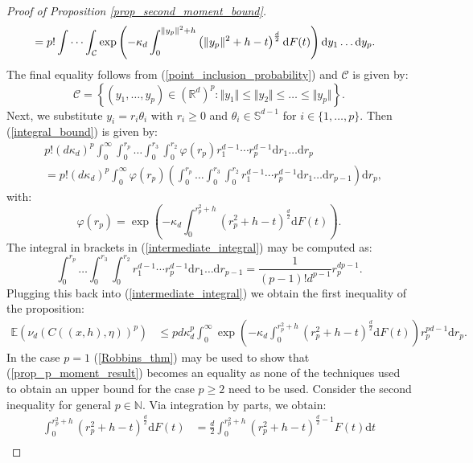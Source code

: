 \documentclass{article}
\newcommand{\NN}{\mathbb{N}}
\newcommand{\RR}{\mathbb{R}}
\newcommand{\EE}{\mathbb{E}}
\newcommand{\Sp}{\mathbb{S}}
\theoremstyle{plain}
\theoremstyle{remark}
\theoremstyle{definition}
\begin{document}
\begin{proof}[Proof of Proposition \ref{prop_second_moment_bound}]
\begin{align}
        &= p!\idotsint_\mathcal{C}\exp\left(-\kappa_d\int_0^{\Vert y_p\Vert^2 + h}\left(\Vert y_p\Vert^2 + h -t \right)^\frac{d}{2}\mathrm{d}F(t)\right)\mathrm{d}y_1 \dots\mathrm{d}y_p. \label{integral_bound}
    \end{align}
    The final equality follows from (\ref{point_inclusion_probability}) and $\mathcal{C}$ is given by:
     \[\mathcal{C} = \left\{(y_1,\dots,y_p) \in (\RR^d)^p: \Vert y_{1} \Vert \leq \Vert y_{2}\Vert \leq \dots \leq \Vert y_{p} \Vert  \right\}.\]
    Next, we substitute $y_i = r_i\theta_i$ with $r_i \geq 0$ and $\theta_i \in \Sp^{d-1}$ for $i \in \{1,\dots,p\}$. Then (\ref{integral_bound}) is given by:
    \begin{align}
         & p!(d\kappa_d)^p \int_0^\infty \int_0^{r_{p}} \dots \int_0^{r_3} \int_0^{r_2} \varphi(r_p)r_1^{d-1}\cdots r_p^{d-1}\mathrm{d}r_1\dots \mathrm{d}r_p \nonumber \\
        &= p!(d\kappa_d)^p \int_0^\infty \varphi(r_p) \left( \int_0^{r_{p}} \dots \int_0^{r_3} \int_0^{r_2}r_1^{d-1}\cdots r_p^{d-1}\mathrm{d}r_1\dots \mathrm{d}r_{p-1}\right)\mathrm{d}r_p, \label{intermediate_integral}
    \end{align}
    with: 
    \[\varphi(r_p) = \exp\left(-\kappa_d\int_0^{r_p^2 + h}\left(r_p^2 + h -t \right)^\frac{d}{2}\mathrm{d}F(t)\right).\]
    The integral in brackets in (\ref{intermediate_integral}) may be computed as:    \[\int_0^{r_{p}} \dots \int_0^{r_3} \int_0^{r_2}r_1^{d-1}\cdots r_p^{d-1}\mathrm{d}r_1\dots \mathrm{d}r_{p-1} = \frac{1}{(p-1)! d^{p-1}}r_p^{dp-1}.\]
    Plugging this back into (\ref{intermediate_integral}) we obtain the first inequality of the proposition:
    \begin{align}
        \EE\left(\nu_d(C((x,h),\eta))^p\right) &\leq pd\kappa_d^p\int_0^\infty \exp\left(-\kappa_d\int_0^{r_p^2 + h}\left(r_p^2 + h -t \right)^\frac{d}{2}\mathrm{d}F(t)\right)r_p^{pd-1}\mathrm{d}r_p. \label{prop_p_moment_result}
    \end{align}
    In the case $p=1$ (\ref{Robbins_thm}) may be used to show that (\ref{prop_p_moment_result}) becomes an equality as none of the techniques used to obtain an upper bound for the case $p \geq 2$ need to be used. Consider the second inequality for general $p \in \NN$. Via integration by parts, we obtain:
    \begin{align}
        \int_0^{r_p^2 + h}\left(r_p^2 + h -t \right)^\frac{d}{2}\mathrm{d}F(t) &= \frac{d}{2}\int_0^{r_p^2 + h}\left(r_p^2 + h -t \right)^{\frac{d}{2}-1}F(t)\mathrm{d}t \nonumber \\

\end{align}
\end{proof}
\end{document}

